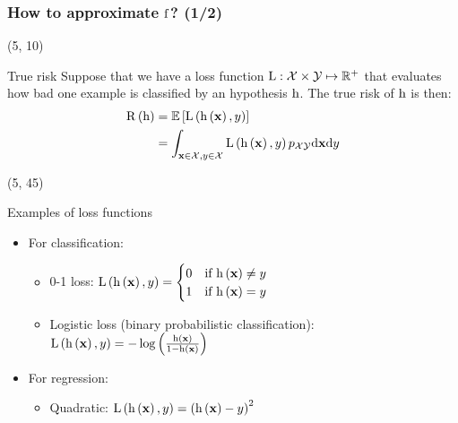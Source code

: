 \begin{frame}
  \frametitle{How to approximate $\mathrm{f}$? (1/2)}

  \begin{textblock}{90}(5, 10)
    \begin{block}{True risk}
      Suppose that we have a loss function $\mathrm{L}: \mathcal{X} \times \mathcal{Y} \mapsto
      \mathbb{R}^+$ that evaluates how bad one example is classified by an hypothesis $\mathrm{h}$.
      The true risk of $\mathrm{h}$ is then:
      \begin{equation}
        \begin{split}
          \mathrm{R} \left ( {\mathrm{h}} \right ) & = \mathrm{\mathbb{E}} \left [ {\mathrm{L} \left ( {\mathrm{h} \left ( {\mathbf{x}} \right ), y} \right )} \right ]\\
                              & = \int_{\mathbf{x} \in \mathcal{X}, y \in \mathcal{X}}
          \mathrm{L} \left ( {\mathrm{h} \left ( {\mathbf{x}} \right ), y} \right ) p_{\mathcal{X} \mathcal{Y}} \mathrm{d} \mathbf{x} \mathrm{d} y
        \end{split}
      \end{equation}
    \end{block}
\end{textblock}

  \begin{textblock}{90}(5, 45)
    \begin{block}{Examples of loss functions}
      \begin{itemize}
      \item For classification:
        \begin{itemize}
        \item 0-1 loss:
          $\mathrm{L} \left ( {\mathrm{h} \left ( {\mathbf{x}} \right ), y} \right ) =
          \begin{cases}
            0 & \text{if $\mathrm{h} \left ( {\mathbf{x}} \right ) \ne y$} \\
            1 & \text{if $\mathrm{h} \left ( {\mathbf{x}} \right )  =  y$}
          \end{cases}
          $
        \item Logistic loss (binary probabilistic classification): $\mathrm{L} \left ( {\mathrm{h} \left ( {\mathbf{x}} \right ),
            y} \right ) = -\log \left ( {\frac{\mathrm{h} \left ( {\mathbf{x}} \right )}{1-\mathrm{h} \left ( {\mathbf{x}} \right )}} \right )$
        \end{itemize}
      \item For regression:
        \begin{itemize}
        \item Quadratic: $\mathrm{L} \left ( {\mathrm{h} \left ( {\mathbf{x}} \right ), y} \right )
          = \left( \mathrm{h} \left ( {\mathbf{x}} \right ) - y \right)^2$
        \end{itemize}
      \end{itemize}
    \end{block}
  \end{textblock}
\end{frame}


